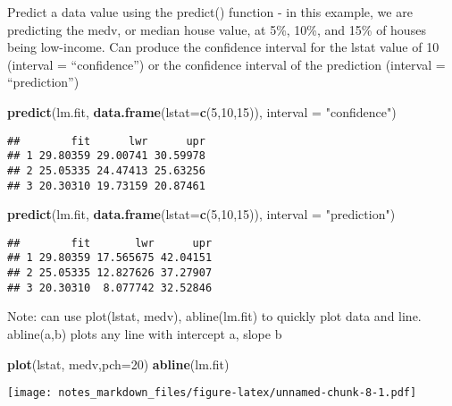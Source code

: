 \documentclass[]{article}
\newenvironment{Shaded}{\begin{snugshade}}{\end{snugshade}}
\newcommand{\KeywordTok}[1]{\textcolor[rgb]{0.13,0.29,0.53}{\textbf{#1}}}
\newcommand{\DataTypeTok}[1]{\textcolor[rgb]{0.13,0.29,0.53}{#1}}
\newcommand{\DecValTok}[1]{\textcolor[rgb]{0.00,0.00,0.81}{#1}}
\newcommand{\StringTok}[1]{\textcolor[rgb]{0.31,0.60,0.02}{#1}}
\newcommand{\NormalTok}[1]{#1}
\begin{document}
Predict a data value using the predict() function - in this example, we
are predicting the medv, or median house value, at 5\%, 10\%, and 15\%
of houses being low-income. Can produce the confidence interval for the
lstat value of 10 (interval = ``confidence'') or the confidence interval
of the prediction (interval = ``prediction'')

\begin{Shaded}
\begin{Highlighting}[]
\KeywordTok{predict}\NormalTok{(lm.fit, }\KeywordTok{data.frame}\NormalTok{(}\DataTypeTok{lstat=}\KeywordTok{c}\NormalTok{(}\DecValTok{5}\NormalTok{,}\DecValTok{10}\NormalTok{,}\DecValTok{15}\NormalTok{)), }\DataTypeTok{interval =} \StringTok{"confidence"}\NormalTok{)}
\end{Highlighting}
\end{Shaded}

\begin{verbatim}
##        fit      lwr      upr
## 1 29.80359 29.00741 30.59978
## 2 25.05335 24.47413 25.63256
## 3 20.30310 19.73159 20.87461
\end{verbatim}

\begin{Shaded}
\begin{Highlighting}[]
\KeywordTok{predict}\NormalTok{(lm.fit, }\KeywordTok{data.frame}\NormalTok{(}\DataTypeTok{lstat=}\KeywordTok{c}\NormalTok{(}\DecValTok{5}\NormalTok{,}\DecValTok{10}\NormalTok{,}\DecValTok{15}\NormalTok{)), }\DataTypeTok{interval =} \StringTok{"prediction"}\NormalTok{)}
\end{Highlighting}
\end{Shaded}

\begin{verbatim}
##        fit       lwr      upr
## 1 29.80359 17.565675 42.04151
## 2 25.05335 12.827626 37.27907
## 3 20.30310  8.077742 32.52846
\end{verbatim}

Note: can use plot(lstat, medv), abline(lm.fit) to quickly plot data and
line. abline(a,b) plots any line with intercept a, slope b

\begin{Shaded}
\begin{Highlighting}[]
\KeywordTok{plot}\NormalTok{(lstat, medv,}\DataTypeTok{pch=}\DecValTok{20}\NormalTok{)}
\KeywordTok{abline}\NormalTok{(lm.fit)}
\end{Highlighting}
\end{Shaded}

\texttt{[image: notes\_markdown\_files/figure-latex/unnamed-chunk-8-1.pdf]}
\end{document}

